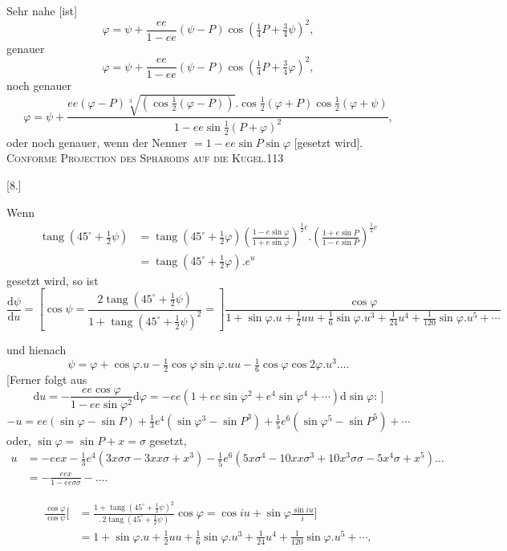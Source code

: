 Sehr nahe [ist]
\[
\varphi=\psi+\frac{ee}{1-ee}(\psi-P)\cos(\tfrac14P+\tfrac34\psi)^2,
\]
genauer
\[
\varphi=\psi+\frac{ee}{1-ee}(\psi-P)\cos(\tfrac14P+\tfrac34\varphi)^2,
\]
noch genauer
\[
\varphi=\psi+\frac{ee(\varphi-P)\sqrt[3]{(\cos\frac12(\varphi-P))}.\cos\frac12(\varphi+P)\cos\frac12(\varphi+\psi)}{1-ee\sin\frac12(P+\varphi)^2},
\]
oder noch genauer, wenn der Nenner $=1-ee\sin P\sin\varphi$ [gesetzt wird].
\clearpage
\noindent\mbox{}\hfill{\small\textsc{Conforme Projection des Sphäroids auf die Kugel.}}\hfill113\par\bigskip
\begin{center}[8.]\end{center}
Wenn
\[
\begin{aligned}
\operatorname{tang}(45^\circ+\tfrac12\psi)&=\operatorname{tang}(45^\circ+\tfrac12\varphi)\left(\frac{1-e\sin\varphi}{1+e\sin\varphi}\right)^{\frac12e}.\left(\frac{1+e\sin P}{1-e\sin P}\right)^{\frac12e}\\
&=\operatorname{tang}(45^\circ+\tfrac12\varphi).e^u
\end{aligned}
\]
gesetzt wird, so ist
\begingroup\footnotesize
\[
\frac{\mathrm d\psi}{\mathrm du}=\left[\cos\psi=\frac{2\operatorname{tang}(45^\circ+\frac12\psi)}{1+\operatorname{tang}(45^\circ+\frac12\psi)^2}=\right]
\frac{\cos\varphi}{1+\sin\varphi.u+\frac12uu+\frac16\sin\varphi.u^3+\frac1{24}u^4+\frac1{120}\sin\varphi.u^5+\cdots}
\]
\par\endgroup
und hienach
\[
\psi=\varphi+\cos\varphi.u-\tfrac12\cos\varphi\sin\varphi.uu-\tfrac16\cos\varphi\cos2\varphi.u^3\ldots.
\]
[Ferner folgt aus
\[
\mathrm du=-\frac{ee\cos\varphi}{1-ee\sin\varphi^2}\mathrm d\varphi=-ee(1+ee\sin\varphi^2+e^4\sin\varphi^4+\cdots)\mathrm d\sin\varphi:\,]
\]
\[
-u=ee(\sin\varphi-\sin P)+\tfrac13e^4(\sin\varphi^3-\sin P^3)+\tfrac15e^6(\sin\varphi^5-\sin P^5)+\cdots
\]
oder, $\sin\varphi=\sin P+x=\sigma$ gesetzt,
\begingroup\small
\[
\begin{aligned}
u&=-eex-\tfrac13e^4(3x\sigma\sigma-3xx\sigma+x^3)-\tfrac15e^6(5x\sigma^4-10xx\sigma^3+10x^3\sigma\sigma-5x^4\sigma+x^5)\ldots\\
&=-\frac{eex}{1-ee\sigma\sigma}-\ldots.
\end{aligned}
\]
\par\endgroup
[Es ist]
\begingroup\small
\[
\begin{aligned}
\frac{\cos\varphi}{\cos\psi}\bigg[&=\frac{1+\operatorname{tang}(45^\circ+\frac12\psi)^2}{.\,2\operatorname{tang}(45^\circ+\frac12\psi)}\cos\varphi=\cos iu+\sin\varphi\frac{\sin iu}{i}\bigg]\\
&=1+\sin\varphi.u+\tfrac12uu+\tfrac16\sin\varphi.u^3+\tfrac1{24}u^4+\tfrac1{120}\sin\varphi.u^5+\cdots,
\end{aligned}
\]
